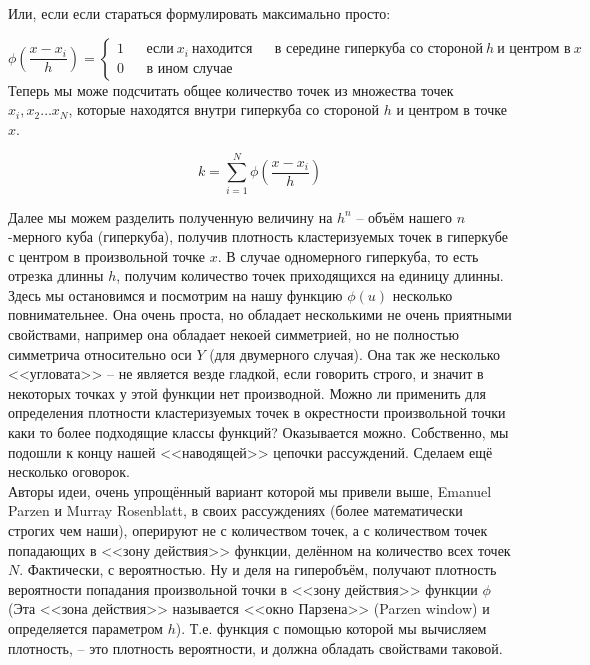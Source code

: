 \documentclass[11pt]{article}
\begin{document}
    Или, если если стараться формулировать максимально просто:

$$ 
\phi\left(\frac{x - x_i}{h}\right) = \left\lbrace
            \begin{aligned}
            1 && \mbox{если} \: x_i \: \mbox{находится} && \mbox{в середине гиперкуба со стороной}\: h \: \mbox{и центром в} \: x \\
            0 && \mbox{в ином случае} &&
           \end{aligned}
          \right.
$$
Теперь мы може подсчитать общее количество точек из множества точек
$x_i, x_2 \ldots x_N$, которые находятся внутри гиперкуба со стороной
$h$ и центром в точке $x$.

$$
k = \sum\limits_{i = 1}^{N}\phi\left(\frac{x - x_i}{h}\right)
$$

 Далее мы можем разделить полученную величину на $h^n$ -- объём
нашего $n$-мерного куба (гиперкуба), получив плотность кластеризуемых
точек в гиперкубе с центром в произвольной точке $x$. В случае
одномерного гиперкуба, то есть отрезка длинны $h$, получим количество
точек приходящихся на единицу длинны. \\ Здесь мы
остановимся и посмотрим на нашу функцию $\phi(u)$ несколько
повнимательнее. Она очень проста, но обладает несколькими не очень
приятными свойствами, например она обладает некоей симметрией, но не
полностью симметрича относительно оси $Y$ (для двумерного случая). Она
так же несколько <<угловата>> -- не является везде гладкой, если
говорить строго, и значит в некоторых точках у этой функции нет
производной. Можно ли применить для определения плотности кластеризуемых
точек в окрестности произвольной точки каки то более подходящие классы
функций? Оказывается можно. Собственно, мы подошли к концу нашей
<<наводящей>> цепочки рассуждений. Сделаем ещё несколько оговорок.
\\  Авторы идеи, очень упрощённый вариант которой мы
привели выше, Emanuel Parzen и Murray Rosenblatt, в своих рассуждениях
(более математически строгих чем наши), оперируют не с количеством
точек, а с количеством точек попадающих в <<зону действия>>
функции, делённом на количество всех точек $N$. Фактически, с
вероятностью. Ну и деля на гиперобъём, получают плотность вероятности
попадания произвольной точки в <<зону действия>> функции $\phi$
(Эта <<зона действия>> называется <<окно Парзена>> (Parzen
window) \cite{litlink0} и определяется параметром $h$). Т.е. функция с
помощью которой мы вычисляем плотность, -- это плотность вероятности,
и должна обладать свойствами таковой.
\end{document}
